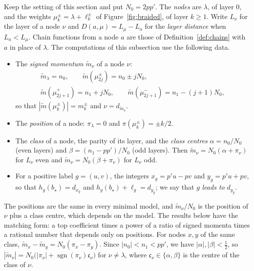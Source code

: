 \documentclass[twoside,10pt]{article}
\numberwithin{equation}{section}
\theoremstyle{slbody}
\theoremstyle{definition}
\theoremstyle{remark}
\begin{document}
Keep the setting of this section and put $N_0=2pp'$.  The \emph{nodes} are
$\lambda$, of layer $0$, and the weights $\mu^\pm_k=\lambda+\ell^\pm_k$ of
Figure~\ref{fig:braided}, of layer $k\geq1$.  Write $L_\nu$ for the layer of a
node $\nu$ and $D(a,\mu)=L_\mu-L_a$ for the \emph{layer distance} when
$L_a<L_\mu$.  Chain functions from a node $a$ are those of
Definition~\ref{def:chains} with $a$ in place of $\lambda$.  The computations
of this subsection use the following data.
\begin{itemize}\setlength{\itemsep}{1pt}
\item The \emph{signed momentum} $\tilde m_\nu$ of a node $\nu$:
\[
 \begin{gathered}
 \tilde m_\lambda=n_0,\qquad \tilde m(\mu^\pm_{2j})=n_0\pm jN_0,\\
 \tilde m(\mu^+_{2j+1})=n_1+jN_0,\qquad \tilde m(\mu^-_{2j+1})=n_1-(j+1)N_0,
 \end{gathered}
\]
  so that $|\tilde m(\mu^\pm_k)|=m^\pm_k$ and $\nu=d_{\tilde m_\nu}$.
\item The \emph{position} of a node: $\pi_\lambda=0$ and $\pi(\mu^\pm_k)=\pm k/2$.
\item The \emph{class} of a node, the parity of its layer, and the
  \emph{class centres} $\alpha=n_0/N_0$ (even layers) and
  $\beta=(n_1-pp')/N_0$ (odd layers).  Then
  $\tilde m_\nu=N_0(\alpha+\pi_\nu)$ for $L_\nu$ even and
  $\tilde m_\nu=N_0(\beta+\pi_\nu)$ for $L_\nu$ odd.
\item For a positive label $g=(u,v)$, the integers $x_g=p'u-pv$ and
  $y_g=p'u+pv$, so that $h_g(b_\star)=d_{x_g}$ and $h_g(b_\star)+\ell_g=d_{y_g}$;
  we say that $g$ \emph{leads to} $d_{y_g}$.
\end{itemize}
The positions are the same in every minimal model, and $\tilde m_\nu/N_0$ is
the position of $\nu$ plus a class centre, which depends on the model.  The
results below have the matching form: a top coefficient times a power of a
ratio of signed momenta times a rational number that depends only on
positions.  For nodes $x,y$ of the same
class, $\tilde m_x-\tilde m_y=N_0(\pi_x-\pi_y)$.  Since $|n_0|<n_1<pp'$, we have
$|\alpha|,|\beta|<\frac12$, so $|\tilde m_\nu|=N_0\bigl(|\pi_\nu|+\operatorname{sgn}(\pi_\nu)\mathfrak c_\nu\bigr)$
for $\nu\neq\lambda$, where $\mathfrak c_\nu\in\{\alpha,\beta\}$ is the centre of the
class of $\nu$.
\end{document}
